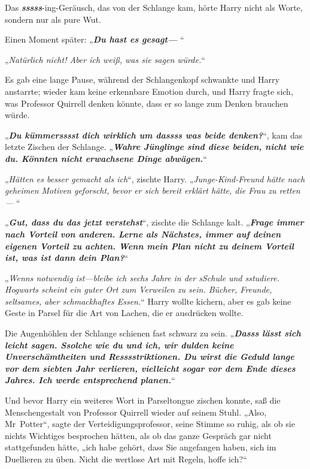 {Das \textbf{\emph{sssss}}-ing-Geräusch, das von der Schlange kam, hörte Harry nicht als Worte, sondern nur als pure Wut.

Einen Moment später: „\textbf{\emph{Du hast es gesagt—} }“

„\emph{Natürlich nicht! Aber ich weiß, was sie sagen würde.}“

Es gab eine lange Pause, während der Schlangenkopf schwankte und Harry anstarrte; wieder kam keine erkennbare Emotion durch, und Harry fragte sich, was Professor Quirrell denken könnte, dass er so lange zum Denken brauchen würde.

„\textbf{\emph{Du kümmersssst dich wirklich um dassss was beide denken?}}“, kam das letzte Zischen der Schlange. „\textbf{\emph{Wahre Jünglinge sind diese beiden, nicht wie du. Könnten nicht erwachsene Dinge abwägen.}}“

„\emph{Hätten es besser gemacht als ich}“, zischte Harry. „\emph{Junge-Kind-Freund hätte nach geheimen Motiven geforscht, bevor er sich bereit erklärt hätte, die Frau zu retten—} “

„\textbf{\emph{Gut, dass du das jetzt verstehst}}“, zischte die Schlange kalt. „\textbf{\emph{Frage immer nach Vorteil von anderen. Lerne als Nächstes, immer auf deinen eigenen Vorteil zu achten. Wenn mein Plan nicht zu deinem Vorteil ist, was ist dann dein Plan?}}“

„\emph{Wenns notwendig ist—bleibe ich sechs Jahre in der sSchule und sstudiere. Hogwarts scheint ein guter Ort zum Verweilen zu sein. Bücher, Freunde, seltsames, aber schmackhaftes Essen.}“ Harry wollte kichern, aber es gab keine Geste in Parsel für die Art von Lachen, die er ausdrücken wollte.

Die Augenhöhlen der Schlange schienen fast schwarz zu sein. „\textbf{\emph{Dasss lässt sich leicht sagen. Ssolche wie du und ich, wir dulden keine Unverschämtheiten und Resssstriktionen. Du wirst die Geduld lange vor dem siebten Jahr verlieren, vielleicht sogar vor dem Ende dieses Jahres. Ich werde entsprechend planen.}}“

Und bevor Harry ein weiteres Wort in Parseltongue zischen konnte, saß die Menschengestalt von Professor Quirrell wieder auf seinem Stuhl. „Also, Mr~Potter“, sagte der Verteidigungsprofessor, seine Stimme so ruhig, als ob sie nichts Wichtiges besprochen hätten, als ob das ganze Gespräch gar nicht stattgefunden hätte, „ich habe gehört, dass Sie angefangen haben, sich im Duellieren zu üben. Nicht die wertlose Art mit Regeln, hoffe ich?“

}
